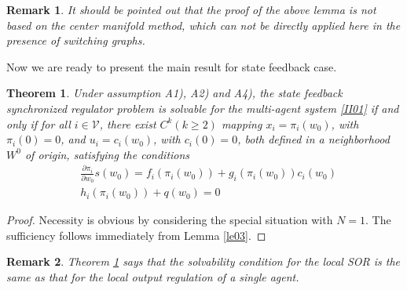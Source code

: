 \documentclass[onecolumn,a4paper,12pt]{article}
\newtheorem{theorem}{Theorem}
\newtheorem{remark}{Remark}
\numberwithin{equation}{section}
\begin{document}
\begin{remark}
It should be pointed out that the proof of the above lemma is not based on the center manifold method, which can not be directly applied here in the presence of switching graphs.
\end{remark}

\bigskip
Now we are ready to present the main result for state feedback case.
\begin{theorem}
  \label{th01}
Under assumption A1), A2) and A4), the state feedback synchronized regulator problem is solvable for the multi-agent system \eqref{II01} if and only if for all $i\in\mathcal{V}$, there exist $C^k(k\ge 2)$ mapping $x_i=\pi_i(w_0)$, with $\pi_i(0)=0$, and $u_i=c_i(w_0)$, with $c_i(0)=0$, both defined in a neighborhood $W^0$ of origin, satisfying the conditions
\begin{subequations} \label{III09}
\begin{align}
 \label{III09a} &\frac{\partial \pi_i}{\partial w_0} s(w_0) = f_i(\pi_i(w_0))+g_i(\pi_i(w_0))c_i(w_0) \\
 \label{III09b} &h_i(\pi_i(w_0))+q(w_0)=0
\end{align}
\end{subequations}
\end{theorem}
\begin{proof}
Necessity is obvious by considering the special situation with $N=1$.  The sufficiency follows immediately from Lemma \ref{le03}.
\end{proof}

\begin{remark}
Theorem \ref{th01} says that the solvability condition for the local SOR is the same as that for the local output regulation of a single agent.
\end{remark}
\end{document}
